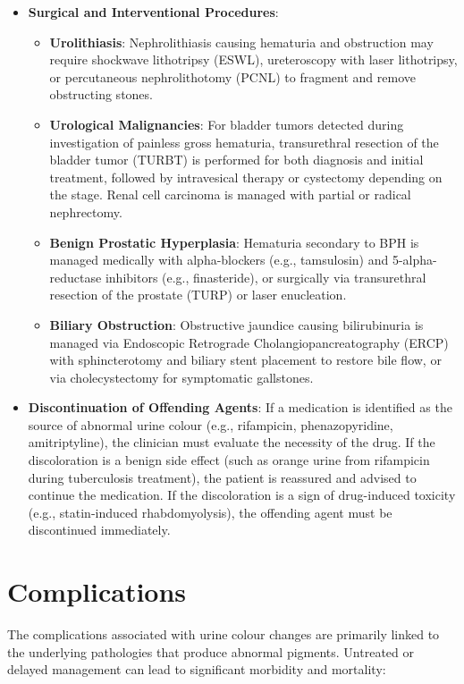 \begin{itemize}
  \item \textbf{Surgical and Interventional Procedures}:
  \begin{itemize}
    \item \textbf{Urolithiasis}: Nephrolithiasis causing hematuria and obstruction may require shockwave lithotripsy (ESWL), ureteroscopy with laser lithotripsy, or percutaneous nephrolithotomy (PCNL) to fragment and remove obstructing stones.
    \item \textbf{Urological Malignancies}: For bladder tumors detected during investigation of painless gross hematuria, transurethral resection of the bladder tumor (TURBT) is performed for both diagnosis and initial treatment, followed by intravesical therapy or cystectomy depending on the stage. Renal cell carcinoma is managed with partial or radical nephrectomy.
    \item \textbf{Benign Prostatic Hyperplasia}: Hematuria secondary to BPH is managed medically with alpha-blockers (e.g., tamsulosin) and 5-alpha-reductase inhibitors (e.g., finasteride), or surgically via transurethral resection of the prostate (TURP) or laser enucleation.
    \item \textbf{Biliary Obstruction}: Obstructive jaundice causing bilirubinuria is managed via Endoscopic Retrograde Cholangiopancreatography (ERCP) with sphincterotomy and biliary stent placement to restore bile flow, or via cholecystectomy for symptomatic gallstones.
  \end{itemize}

  \item \textbf{Discontinuation of Offending Agents}: If a medication is identified as the source of abnormal urine colour (e.g., rifampicin, phenazopyridine, amitriptyline), the clinician must evaluate the necessity of the drug. If the discoloration is a benign side effect (such as orange urine from rifampicin during tuberculosis treatment), the patient is reassured and advised to continue the medication. If the discoloration is a sign of drug-induced toxicity (e.g., statin-induced rhabdomyolysis), the offending agent must be discontinued immediately.
\end{itemize}

\section*{Complications}
The complications associated with urine colour changes are primarily linked to the underlying pathologies that produce abnormal pigments. Untreated or delayed management can lead to significant morbidity and mortality:

